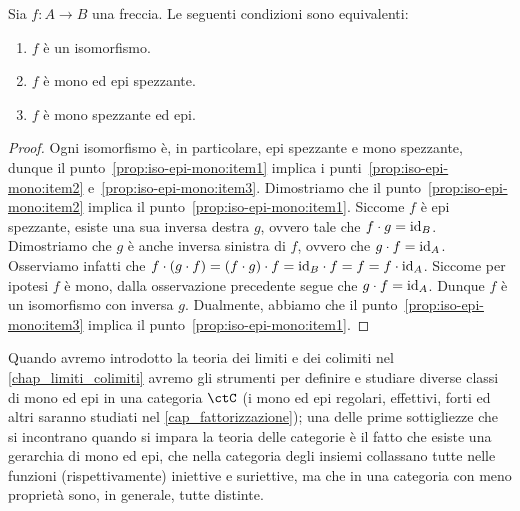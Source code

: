 \begin{proposition}\label{prop:iso-epi-mono}
 Sia \(f \colon A \to B\) una freccia. Le seguenti condizioni sono equivalenti:
 \begin{enumerate}
  \item\label{prop:iso-epi-mono:item1} \(f\) è un isomorfismo.
  \item\label{prop:iso-epi-mono:item2} \(f\) è mono ed epi spezzante.
  \item\label{prop:iso-epi-mono:item3} \(f\) è mono spezzante ed epi.
 \end{enumerate}
\end{proposition}
\begin{proof}
 Ogni isomorfismo è, in particolare, epi spezzante e mono spezzante, dunque il punto~\ref{prop:iso-epi-mono:item1} implica i punti~\ref{prop:iso-epi-mono:item2} e~\ref{prop:iso-epi-mono:item3}.
 Dimostriamo che il punto~\ref{prop:iso-epi-mono:item2} implica il punto~\ref{prop:iso-epi-mono:item1}.
 Siccome \(f\) è epi spezzante, esiste una sua inversa destra \(g\), ovvero tale che \(f \cdot g = \mathrm{id}_{B}\).
 Dimostriamo che \(g\) è anche inversa sinistra di \(f\), ovvero che \(g \cdot f = \mathrm{id}_{A}\).
 Osserviamo infatti che \(f \cdot (g \cdot f) = (f \cdot g) \cdot f = \mathrm{id}_{B} \cdot f = f = f \cdot \mathrm{id}_{A}\).
 Siccome per ipotesi \(f\) è mono, dalla osservazione precedente segue che \(g \cdot f = \mathrm{id}_{A}\).
 Dunque \(f\) è un isomorfismo con inversa \(g\).
 Dualmente, abbiamo che il punto~\ref{prop:iso-epi-mono:item3} implica il punto~\ref{prop:iso-epi-mono:item1}.
\end{proof}
Quando avremo introdotto la teoria dei limiti e dei colimiti nel \autoref{chap_limiti_colimiti} avremo gli strumenti per definire e studiare diverse classi di mono ed epi in una categoria \(\ctC\) (i mono ed epi regolari, effettivi, forti ed altri saranno studiati nel \autoref{cap_fattorizzazione}); una delle prime sottigliezze che si incontrano quando si impara la teoria delle categorie è il fatto che esiste una gerarchia di mono ed epi, che nella categoria degli insiemi collassano tutte nelle funzioni (rispettivamente) iniettive e suriettive, ma che in una categoria con meno proprietà sono, in generale, tutte distinte.

